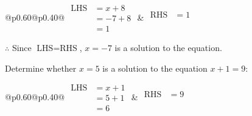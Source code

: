 \documentclass[12pt]{article}
\newcounter{minipagecount}
\begin{document}
\begin{multicols}{2}
\begin{minipage}[t]{0.40\textwidth}
    \noindent
    \renewcommand{\arraystretch}{1.3} %
    \begin{tabular}{@{}p{0.60\linewidth}@{}p{0.40\linewidth}@{}}
        \(\begin{aligned}
            \text{LHS} &= x + 8 \\
                    &= -7 + 8 \\
                    &= 1 
        \end{aligned}\) &
        \(\begin{aligned}
            \text{RHS} &= 1\\
                    & \\
                    &
        \end{aligned}\)
    \end{tabular}
    \renewcommand{\arraystretch}{1.0} %
    \vspace{2pt}  %

    \noindent \(\therefore\) Since \(\text{LHS} = \text{RHS}\), \(x = -7\) is  a solution to the equation.

\end{minipage}

 \vspace*{16pt}
\noindent{(\theminipagecount)}\hspace{0.1mm} %
\begin{minipage}[t]{0.40\textwidth} %

    \noindent Determine whether \(x = 5\) is a solution to the equation \(x + 1 = 9\):
    \vspace{4pt}  %

    \noindent
    \renewcommand{\arraystretch}{1.3} %
    \begin{tabular}{@{}p{0.60\linewidth}@{}p{0.40\linewidth}@{}}
        \(\begin{aligned}
            \text{LHS} &= x + 1 \\
                    &= 5 + 1 \\
                    &= 6 
        \end{aligned}\) &
        \(\begin{aligned}
            \text{RHS} &= 9\\
                    & \\
                    &
        \end{aligned}\)
    \end{tabular}
    \renewcommand{\arraystretch}{1.0} %
    \vspace{2pt}  %


\end{minipage}
\end{multicols}
\end{document}
